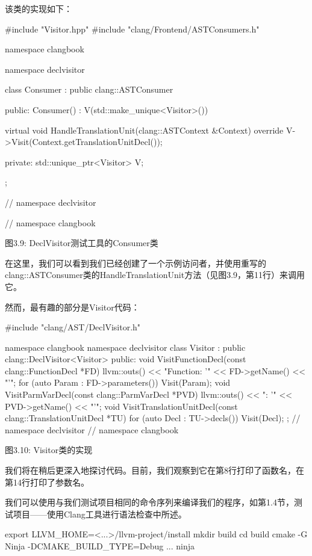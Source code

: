 该类的实现如下：

\begin{cpp}
#include "Visitor.hpp"
#include "clang/Frontend/ASTConsumers.h"

namespace clangbook {
namespace declvisitor {
class Consumer : public clang::ASTConsumer {
public:
  Consumer() : V(std::make_unique<Visitor>()) {}

  virtual void HandleTranslationUnit(clang::ASTContext &Context) override {
    V->Visit(Context.getTranslationUnitDecl());
  }

private:
  std::unique_ptr<Visitor> V;
};
} // namespace declvisitor
} // namespace clangbook
\end{cpp}

\begin{center}
图3.9: DeclVisitor测试工具的Consumer类
\end{center}

在这里，我们可以看到我们已经创建了一个示例访问者，并使用重写的clang::ASTConsumer类的HandleTranslationUnit方法（见图3.9，第11行）来调用它。

然而，最有趣的部分是Visitor代码：

\begin{cpp}
#include "clang/AST/DeclVisitor.h"

namespace clangbook {
namespace declvisitor {
class Visitor : public clang::DeclVisitor<Visitor> {
public:
  void VisitFunctionDecl(const clang::FunctionDecl *FD) {
    llvm::outs() << "Function: '" << FD->getName() << "'\n";
    for (auto Param : FD->parameters()) {
      Visit(Param);
    }
  }
  void VisitParmVarDecl(const clang::ParmVarDecl *PVD) {
    llvm::outs() << "\tParameter: '" << PVD->getName() << "'\n";
  }
  void VisitTranslationUnitDecl(const clang::TranslationUnitDecl *TU) {
    for (auto Decl : TU->decls()) {
      Visit(Decl);
    }
  }
};
} // namespace declvisitor
} // namespace clangbook
\end{cpp}

\begin{center}
图3.10: Visitor类的实现
\end{center}

我们将在稍后更深入地探讨代码。目前，我们观察到它在第8行打印了函数名，在第14行打印了参数名。

我们可以使用与我们测试项目相同的命令序列来编译我们的程序，如第1.4节，测试项目——使用Clang工具进行语法检查中所述。

\begin{shell}
export LLVM_HOME=<...>/llvm-project/install
mkdir build
cd build
cmake -G Ninja -DCMAKE_BUILD_TYPE=Debug ...
ninja
\end{shell}

